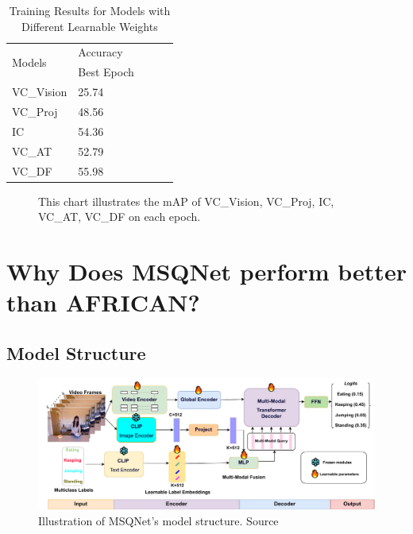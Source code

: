 \begin{table}[ht]
    \centering
    \caption{Training Results for Models with Different Learnable Weights}
    \label{tab:ablation_vc}
    \begin{tabular}{lllll}
        \toprule
        \multirow{2}{*}{Models} & Accuracy \\
        \cmidrule{2-2} 
        {} &  Best Epoch \\
        \midrule
        VC\_Vision & 25.74 \\
        VC\_Proj   & 48.56 \\
        IC         & 54.36 \\
        VC\_AT     & 52.79 \\
        VC\_DF     & 55.98 \\
        \bottomrule
    \end{tabular}
\end{table}

\begin{figure}[ht]
    \centering
    \resizebox{1.0\textwidth}{!}{}
    \caption[mAP of VC\_Vision, VC\_Proj, IC, VC\_AT, VC\_DF on each Epoch]{This chart illustrates the mAP of VC\_Vision, VC\_Proj, IC, VC\_AT, VC\_DF on each epoch.}
    \label{fig:ablation_vc}
\end{figure}

\section{Why Does MSQNet perform better than AFRICAN?}
\label{sec:discussion_msqnet}

\subsection{Model Structure}
\begin{figure}[ht]
    \centering
    \includegraphics[width=1.0\textwidth]{assets/charts_rw/MSQNet}
    \caption[Model Structure of MSQNet]{Illustration of MSQNet's model structure. Source \parencite{mondal2023msqnet}}
    \label{fig:discussion_msqnet}
\end{figure}


